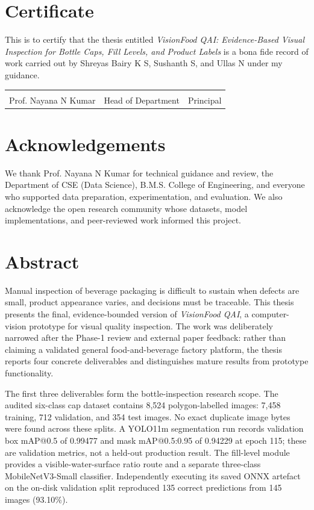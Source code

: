 \documentclass[12pt,a4paper]{report}
\newcommand{\project}{\textit{VisionFood QAI}}
\begin{document}
\chapter*{Certificate}
This is to certify that the thesis entitled \emph{VisionFood QAI: Evidence-Based Visual Inspection for Bottle Caps, Fill Levels, and Product Labels} is a bona fide record of work carried out by Shreyas Bairy K S, Sushanth S, and Ullas N under my guidance.\\[1in]
\begin{tabular}{lll}\hrulefill & \hrulefill & \hrulefill\\Prof. Nayana N Kumar & Head of Department & Principal\end{tabular}

\chapter*{Acknowledgements}
We thank Prof. Nayana N Kumar for technical guidance and review, the Department of CSE (Data Science), B.M.S. College of Engineering, and everyone who supported data preparation, experimentation, and evaluation. We also acknowledge the open research community whose datasets, model implementations, and peer-reviewed work informed this project.

\chapter*{Abstract}
Manual inspection of beverage packaging is difficult to sustain when defects are small, product appearance varies, and decisions must be traceable. This thesis presents the final, evidence-bounded version of \project{}, a computer-vision prototype for visual quality inspection. The work was deliberately narrowed after the Phase-1 review and external paper feedback: rather than claiming a validated general food-and-beverage factory platform, the thesis reports four concrete deliverables and distinguishes mature results from prototype functionality.

The first three deliverables form the bottle-inspection research scope. The audited six-class cap dataset contains 8,524 polygon-labelled images: 7,458 training, 712 validation, and 354 test images. No exact duplicate image bytes were found across these splits. A YOLO11m segmentation run records validation box mAP@0.5 of 0.99477 and mask mAP@0.5:0.95 of 0.94229 at epoch 115; these are validation metrics, not a held-out production result. The fill-level module provides a visible-water-surface ratio route and a separate three-class MobileNetV3-Small classifier. Independently executing its saved ONNX artefact on the on-disk validation split reproduced 135 correct predictions from 145 images (93.10\%).
\end{document}

